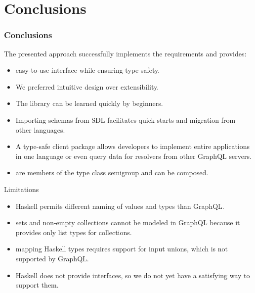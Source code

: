 \section{Conclusions}

\begin{frame}[allowframebreaks]\frametitle{Conclusions}

The presented approach successfully implements the requirements and provides:

\begin{itemize}
    \item easy-to-use interface while ensuring type safety.
    \item We preferred intuitive design over extensibility.
    \item The library can be learned quickly by beginners.
    \item Importing schemas from SDL facilitates quick starts and migration from other languages.
    \item A type-safe client package allows developers to implement entire applications in one language or even query data for resolvers from other GraphQL servers.
    \item {} are members of the type class semigroup and can be composed.
\end{itemize}

Limitations

\begin{itemize}
    \item Haskell permits different naming of values and types than GraphQL. 
    \item sets and non-empty collections cannot be modeled in GraphQL because it provides only list types for collections. 
    \item mapping Haskell types requires support for input unions, which is not supported by GraphQL. 
    \item Haskell does not provide interfaces, so we do not yet have a satisfying way to support them. 
\end{itemize}

\end{frame}

